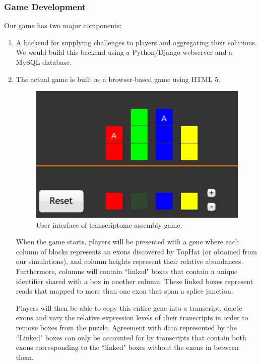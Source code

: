 \documentclass[12pt]{article}
\begin{document}
\subsubsection*{Game Development}
Our game has two major components:
\begin{enumerate}
\item A backend for supplying challenges to players and aggregating their solutions. We would build this backend using a Python/Django webserver and a MySQL database.
\item The actual game is built as a browser-based game using HTML 5.

\begin{figure}[H]
\includegraphics[scale=0.5]{gameshot.png}
\caption{User interface of transcriptome assembly game.}
\centering
\label{fig:proposedui}
\end{figure}

When the game starts, players will be presented with a gene where each column of blocks represents an exons discovered by TopHat (or obtained from our simulations), and column heights represent their relative abundances. Furthermore, columns will contain ``linked" boxes that contain a unique identifier shared with a box in another column. These linked boxes represent reads that mapped to more than one exon that span a splice junction. 

Players will then be able to copy this entire gene into a transcript, delete exons and vary the relative expression levels of their transcripts in order to remove boxes from the puzzle. Agreement with data represented by the ``Linked" boxes can only be accounted for by transcripts that contain both exons corresponding to the ``linked" boxes without the exons in between them.


\end{enumerate}
\end{document}
